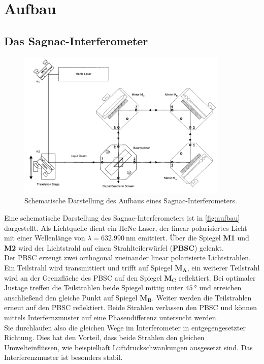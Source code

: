 \section{Aufbau}
\subsection{Das Sagnac-Interferometer}
\label{sec:sagnac}
\begin{figure}
    \centering
    \includegraphics[width=0.9\textwidth]{img/aufbau_schematisch.png}
    \caption{Schematische Darstellung des Aufbaus eines Sagnac-Interferometers. \cite{sample}}
    \label{fig:aufbau}
\end{figure}
Eine schematische Darstellung des Sagnac-Interferometers ist in \autoref{fig:aufbau} dargestellt.
Als Lichtquelle dient ein HeNe-Laser, der linear polarisiertes Licht mit einer Wellenlänge von $\lambda = \qty{632.990}{\nano\metre}$ emittiert.
Über die Spiegel \textbf{M1} und \textbf{M2} wird der Lichtstrahl auf einen Strahlteilerwürfel (\textbf{PBSC}) gelenkt.
\\
Der PBSC erzeugt zwei orthogonal zueinander linear polarisierte Lichtstrahlen.
Ein Teilstrahl wird transmittiert und trifft auf Spiegel $\mathbf{M_A}$, ein weiterer Teilstrahl wird an der Grenzfläche des PBSC auf den Spiegel $\mathbf{M_C}$ reflektiert.
Bei optimaler Justage treffen die Teilstrahlen beide Spiegel mittig unter $\qty{45}{\degree}$ und erreichen anschließend den gleiche Punkt auf Spiegel $\mathbf{M_B}$.
Weiter werden die Teilstrahlen erneut auf den PBSC reflektiert.
Beide Strahlen verlassen den PBSC und können mittels Interfernzmuster auf eine Phasendifferenz untersucht werden.
\\
Sie durchlaufen also die gleichen Wege im Interferometer in entgegengesetzter Richtung.
Dies hat den Vorteil, dass beide Strahlen den gleichen Umwelteinflüssen, wie beispielhaft Luftdruckschwankungen ausgesetzt sind.
Das Interferenzmuster ist besonders stabil.

